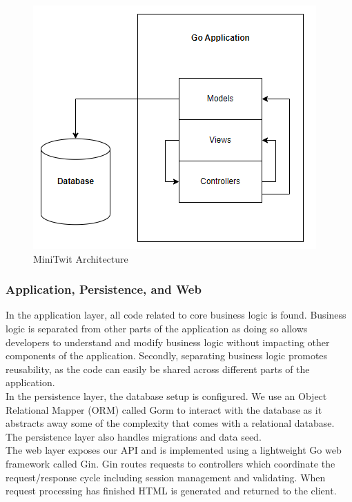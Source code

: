 \begin{figure}[H]
    \centering
    \captionsetup{justification=centering,margin=1cm}
    \includegraphics[width=0.55\linewidth]{report/images/system_architecture.png}
    \caption{MiniTwit Architecture}
    \label{fig:minitwit_arch}
\end{figure}



\subsubsection{Application, Persistence, and Web}
In the application layer, all code related to core business logic is found. 
Business logic is separated from other parts of the application as doing so allows developers to understand and modify business logic without impacting other components of the application. 
Secondly, separating business logic promotes reusability, as the code can easily be shared across different parts of the application. \\

In the persistence layer, the database setup is configured. We use an Object Relational Mapper (ORM) called Gorm to interact with the database as it abstracts away some of the complexity that comes with a relational database. 
The persistence layer also handles migrations and data seed. \\

The web layer exposes our API and is implemented using a lightweight Go web framework called Gin.  
Gin routes requests to controllers which coordinate the request/response cycle including session management and validating. 
When request processing has finished HTML is generated and returned to the client.

